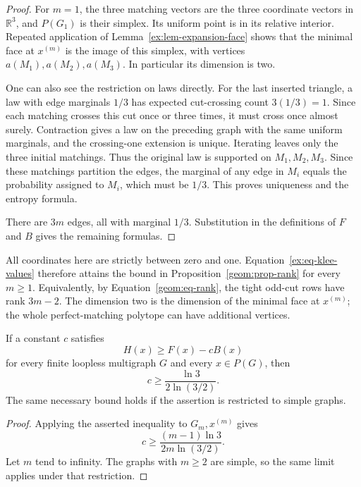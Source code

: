 \begin{proof}
For \(m=1\), the three matching vectors are the three coordinate
vectors in \(\mathbb R^3\), and \(P(G_1)\) is their simplex.
Its uniform point is in its relative interior. Repeated application
of Lemma~\ref{ex:lem-expansion-face} shows that the minimal face at
\(x^{(m)}\) is the image of this simplex, with vertices
\(a(M_1),a(M_2),a(M_3)\). In particular its dimension is two.

One can also see the restriction on laws directly. For the last
inserted triangle, a law with edge marginals \(1/3\) has expected
cut-crossing count \(3(1/3)=1\). Since each matching crosses this
cut once or three times, it must cross once almost surely.
Contraction gives a law on the preceding graph with the same
uniform marginals, and the crossing-one extension is unique.
Iterating leaves only the three initial matchings. Thus the
original law is supported on \(M_1,M_2,M_3\). Since these
matchings partition the edges, the marginal of any edge in
\(M_i\) equals the probability assigned to \(M_i\), which must
be \(1/3\). This proves uniqueness and the entropy formula.

There are \(3m\) edges, all with marginal \(1/3\). Substitution
in the definitions of \(F\) and \(B\) gives the remaining
formulas.
\end{proof}

All coordinates here are strictly between zero and one.
Equation~\eqref{ex:eq-klee-values} therefore attains the bound in
Proposition~\ref{geom:prop-rank} for every \(m\ge1\). Equivalently,
by Equation~\eqref{geom:eq-rank}, the tight odd-cut rows have rank
\(3m-2\). The dimension two is the dimension of the minimal face
at \(x^{(m)}\); the whole perfect-matching polytope can have
additional vertices.

\begin{corollary}
\label{ex:cor-coefficient}
If a constant \(c\) satisfies
\[
 H(x)\ge F(x)-cB(x)
\]
for every finite loopless multigraph \(G\) and every
\(x\in P(G)\), then
\[
 c\ge\frac{\ln3}{2\ln(3/2)}.
\]
The same necessary bound holds if the assertion is restricted to
simple graphs.
\end{corollary}

\begin{proof}
Applying the asserted inequality to \(G_m,x^{(m)}\) gives
\[
 c\ge
 \frac{(m-1)\ln3}{2m\ln(3/2)}.
\]
Let \(m\) tend to infinity. The graphs with \(m\ge2\) are simple,
so the same limit applies under that restriction.
\end{proof}


